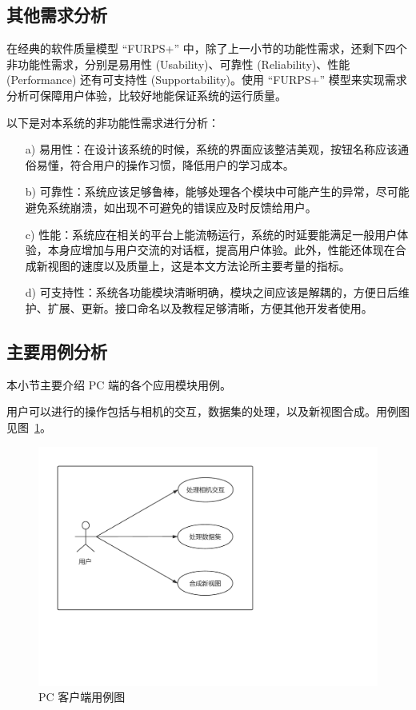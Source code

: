 \subsection{其他需求分析}
在经典的软件质量模型 “FURPS+” 中，除了上一小节的功能性需求，还剩下四个非功能性需求，分别是易用性 (Usability)、可靠性 (Reliability)、性能 (Performance) 还有可支持性 (Supportability)。使用 “FURPS+” 模型来实现需求分析可保障用户体验，比较好地能保证系统的运行质量。

以下是对本系统的非功能性需求进行分析：
\begin{enumerate}
    \item [a)] 易用性：在设计该系统的时候，系统的界面应该整洁美观，按钮名称应该通俗易懂，符合用户的操作习惯，降低用户的学习成本。
    \item [b)] 可靠性：系统应该足够鲁棒，能够处理各个模块中可能产生的异常，尽可能避免系统崩溃，如出现不可避免的错误应及时反馈给用户。     
    \item [c)] 性能：系统应在相关的平台上能流畅运行，系统的时延要能满足一般用户体验，本身应增加与用户交流的对话框，提高用户体验。此外，性能还体现在合成新视图的速度以及质量上，这是本文方法论所主要考量的指标。
    \item [d)] 可支持性：系统各功能模块清晰明确，模块之间应该是解耦的，方便日后维护、扩展、更新。接口命名以及教程足够清晰，方便其他开发者使用。
\end{enumerate}

\subsection{主要用例分析}
本小节主要介绍 PC 端的各个应用模块用例。

用户可以进行的操作包括与相机的交互，数据集的处理，以及新视图合成。用例图见图~\ref{fig:PCusercase}。

\pagebreak
\begin{figure}[htb]
	\centering
	\includegraphics[width=0.55\linewidth]{figures/usercase.pdf}
	\caption{PC 客户端用例图}
	\label{fig:PCusercase}
\end{figure}

